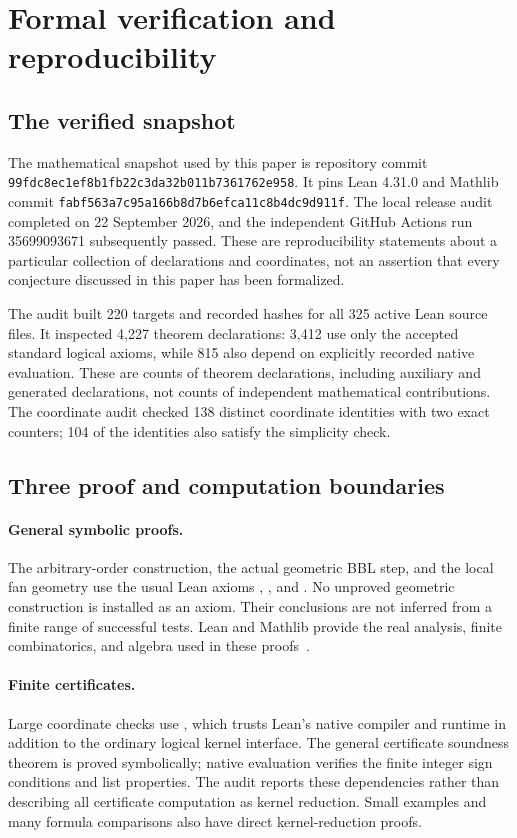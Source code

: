 \section{Formal verification and reproducibility}\label{sec:formalization}

\subsection{The verified snapshot}

The mathematical snapshot used by this paper is repository commit
\nolinkurl{99fdc8ec1ef8b1fb22c3da32b011b7361762e958}. It pins Lean 4.31.0 and Mathlib commit
\nolinkurl{fabf563a7c95a166b8d7b6efca11c8b4dc9d911f}. The local release audit completed on 22 September 2026, and the independent GitHub Actions run 35699093671 subsequently passed. These are reproducibility statements about a particular collection of declarations and coordinates, not an assertion that every conjecture discussed in this paper has been formalized.

The audit built 220 targets and recorded hashes for all 325 active Lean source files. It inspected 4,227 theorem declarations: 3,412 use only the accepted standard logical axioms, while 815 also depend on explicitly recorded native evaluation. These are counts of theorem declarations, including auxiliary and generated declarations, not counts of independent mathematical contributions. The coordinate audit checked 138 distinct coordinate identities with two exact counters; 104 of the identities also satisfy the simplicity check.

\subsection{Three proof and computation boundaries}

\paragraph{General symbolic proofs.}
The arbitrary-order construction, the actual geometric BBL step, and the local fan geometry use the usual Lean axioms , , and . No unproved geometric construction is installed as an axiom. Their conclusions are not inferred from a finite range of successful tests. Lean and Mathlib provide the real analysis, finite combinatorics, and algebra used in these proofs~\cite{lean4,mathlib}.

\paragraph{Finite certificates.}
Large coordinate checks use , which trusts Lean's native compiler and runtime in addition to the ordinary logical kernel interface. The general certificate soundness theorem is proved symbolically; native evaluation verifies the finite integer sign conditions and list properties. The audit reports these dependencies rather than describing all certificate computation as kernel reduction. Small examples and many formula comparisons also have direct kernel-reduction proofs.

